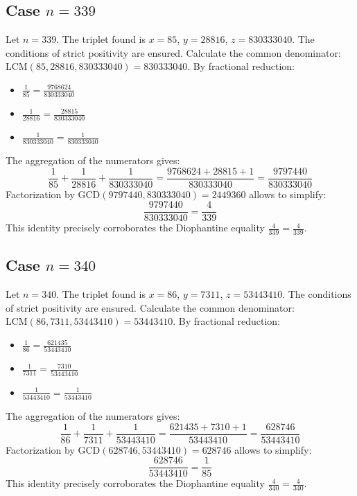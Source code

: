 \documentclass[11pt,a4paper]{article}
\begin{document}
\subsection{Case $n = 339$}
Let $n = 339$. The triplet found is $x = 85$, $y = 28816$, $z = 830333040$.
The conditions of strict positivity are ensured.
Calculate the common denominator: $\text{LCM}(85, 28816, 830333040) = 830333040$.
By fractional reduction:
\begin{itemize}
    \item $\frac{1}{85} = \frac{9768624}{830333040}$
    \item $\frac{1}{28816} = \frac{28815}{830333040}$
    \item $\frac{1}{830333040} = \frac{1}{830333040}$
\end{itemize}
The aggregation of the numerators gives:
$$ \frac{1}{85} + \frac{1}{28816} + \frac{1}{830333040} = \frac{9768624 + 28815 + 1}{830333040} = \frac{9797440}{830333040} $$
Factorization by $\text{GCD}(9797440, 830333040) = 2449360$ allows to simplify:
$$ \frac{9797440}{830333040} = \frac{4}{339} $$
This identity precisely corroborates the Diophantine equality $\frac{4}{339} = \frac{4}{339}$.

\subsection{Case $n = 340$}
Let $n = 340$. The triplet found is $x = 86$, $y = 7311$, $z = 53443410$.
The conditions of strict positivity are ensured.
Calculate the common denominator: $\text{LCM}(86, 7311, 53443410) = 53443410$.
By fractional reduction:
\begin{itemize}
    \item $\frac{1}{86} = \frac{621435}{53443410}$
    \item $\frac{1}{7311} = \frac{7310}{53443410}$
    \item $\frac{1}{53443410} = \frac{1}{53443410}$
\end{itemize}
The aggregation of the numerators gives:
$$ \frac{1}{86} + \frac{1}{7311} + \frac{1}{53443410} = \frac{621435 + 7310 + 1}{53443410} = \frac{628746}{53443410} $$
Factorization by $\text{GCD}(628746, 53443410) = 628746$ allows to simplify:
$$ \frac{628746}{53443410} = \frac{1}{85} $$
This identity precisely corroborates the Diophantine equality $\frac{4}{340} = \frac{4}{340}$.
\end{document}

